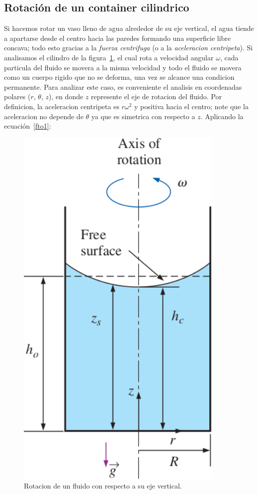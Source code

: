 \documentclass[10pt, oneside]{article}
\begin{document}
\subsection{Rotaci\'on de un container cilindrico}
Si hacemos rotar un vaso lleno de agua alrededor de su eje vertical, el agua tiende a apartarse desde el centro hacia las paredes formando una superficie libre concava; todo esto gracias a la \emph{fuerza centrifuga} (o a la \emph{aceleracion centripeta}). Si analisamos el cilindro de la figura~\ref{cili}, el cual rota a velocidad angular $\omega$,  cada particula del fluido se movera a la misma velocidad y todo el fluido se movera como un cuerpo rigido que no se deforma, una vez se alcance una condicion permanente. Para analizar este caso, es conveniente el analisis en coordenadas polares ($r$, $\theta$, $z$), en donde $z$ represente el eje de rotacion del fluido. Por definicion, la aceleracion centripeta es $r \omega^2$ y positiva hacia el centro; note que la aceleracion no depende de $\theta$ ya que es simetrica con respecto a $z$. Aplicando la ecuaci\'on~\ref{fto1}:
\begin{figure}[h]
\centering
\includegraphics[width=10cm]{cili}
\caption{Rotacion de un fluido con respecto a su eje vertical.}
\label{cili}
\end{figure}
\end{document}
